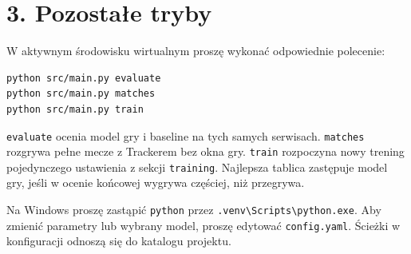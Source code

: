 \documentclass[11pt,a4paper]{article}
\begin{document}
\section*{3. Pozostałe tryby}
W aktywnym środowisku wirtualnym proszę wykonać odpowiednie polecenie:
\begin{verbatim}
python src/main.py evaluate
python src/main.py matches
python src/main.py train
\end{verbatim}
\texttt{evaluate} ocenia model gry i baseline na tych samych serwisach.
\texttt{matches} rozgrywa pełne mecze z Trackerem bez okna gry.
\texttt{train} rozpoczyna nowy trening pojedynczego ustawienia
z sekcji \texttt{training}. Najlepsza tablica zastępuje model gry,
jeśli w ocenie końcowej wygrywa częściej, niż przegrywa.

Na Windows proszę zastąpić \texttt{python} przez
\texttt{.venv\textbackslash Scripts\textbackslash python.exe}.
Aby zmienić parametry lub wybrany model, proszę edytować \texttt{config.yaml}.
Ścieżki w konfiguracji odnoszą się do katalogu projektu.
\end{document}
